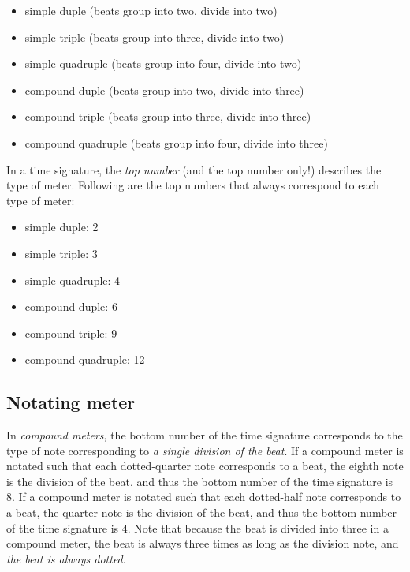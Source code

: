 \documentclass{book}
\providecommand{\tightlist}{%
  \setlength{\itemsep}{0pt}\setlength{\parskip}{0pt}}
\begin{document}
\begin{itemize}
\tightlist
\item
  simple duple (beats group into two, divide into two)
\item
  simple triple (beats group into three, divide into two)
\item
  simple quadruple (beats group into four, divide into two)
\item
  compound duple (beats group into two, divide into three)
\item
  compound triple (beats group into three, divide into three)
\item
  compound quadruple (beats group into four, divide into three)
\end{itemize}

In a time signature, the \emph{top number} (and the top number only!)
describes the type of meter. Following are the top numbers that always
correspond to each type of meter:

\begin{itemize}
\tightlist
\item
  simple duple: 2
\item
  simple triple: 3
\item
  simple quadruple: 4
\item
  compound duple: 6
\item
  compound triple: 9
\item
  compound quadruple: 12
\end{itemize}

\hypertarget{notating-meter-1}{%
\subsection{Notating meter}\label{notating-meter-1}}

In \emph{compound meters}, the bottom number of the time signature corresponds
to the type of note corresponding to \emph{a single division of the beat}. If
a compound meter is notated such that each dotted-quarter note corresponds to
a beat, the eighth note is the division of the beat, and thus the bottom
number of the time signature is 8. If a compound meter is notated such that
each dotted-half note corresponds to a beat, the quarter note is the division
of the beat, and thus the bottom number of the time signature is 4. Note that
because the beat is divided into three in a compound meter, the beat is always
three times as long as the division note, and \emph{the beat is always
dotted}.
\end{document}
